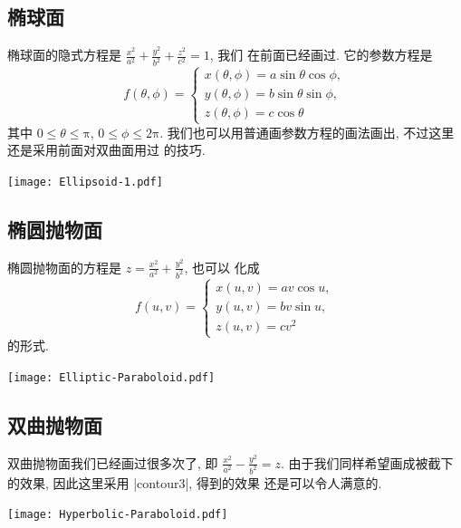 \documentclass[nofonts,CJKnormalspaces]{ctexbook}
\let\leq\leqslant
\begin{document}
\subsection{椭球面}
椭球面的隐式方程是
$\frac{x^{2}}{a^{2}}+\frac{y^{2}}{b^{2}}+\frac{z^{2}}{c^{2}}=1$, 我们
在前面已经画过. 它的参数方程是
\begin{equation}
  f(\theta,\phi)=\left\{
    \begin{array}{ll}
      x(\theta,\phi)=a\sin\theta\cos\phi,\\
      y(\theta,\phi)=b\sin\theta\sin\phi,\\
      z(\theta,\phi)=c\cos\theta
    \end{array}\right.
\end{equation}
其中 $0\leq\theta\leq\mathrm{\pi}$, $0\leq\phi\leq\mathrm{2\pi}$.
我们也可以用普通画参数方程的画法画出, 不过这里还是采用前面对双曲面用过
的技巧.
\begin{center}\texttt{[image: Ellipsoid-1.pdf]}\end{center}%


\subsection{椭圆抛物面}
椭圆抛物面的方程是 $z=\frac{x^{2}}{a^{2}}+\frac{y^{2}}{b^{2}}$, 也可以
化成
\begin{equation}
  f(u,v)=\left\{
    \begin{array}{ll}
      x(u,v)=a v \cos u,\\
      y(u,v)=b v \sin u,\\
      z(u,v)=c v^{2}
    \end{array}\right.
\end{equation}
的形式.
\begin{center}\texttt{[image: Elliptic-Paraboloid.pdf]}\end{center}%


\subsection{双曲抛物面}
双曲抛物面我们已经画过很多次了, 即
$\frac{x^{2}}{a^{2}}-\frac{y^{2}}{b^{2}}=z$.
由于我们同样希望画成被截下的效果, 因此这里采用 |contour3|, 得到的效果
还是可以令人满意的.
\begin{center}\texttt{[image: Hyperbolic-Paraboloid.pdf]}\end{center}%

\end{document}
